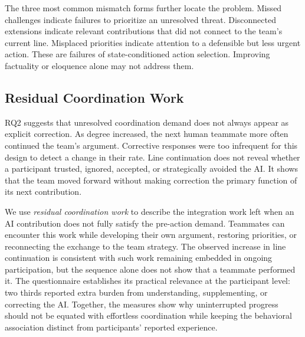 \documentclass[manuscript,review,anonymous]{acmart}
\begin{document}
The three most common mismatch forms further locate the problem. Missed challenges indicate failures to prioritize an unresolved threat. Disconnected extensions indicate relevant contributions that did not connect to the team's current line. Misplaced priorities indicate attention to a defensible but less urgent action. These are failures of state-conditioned action selection. Improving factuality or eloquence alone may not address them.

\subsection{Residual Coordination Work}

RQ2 suggests that unresolved coordination demand does not always appear as explicit correction. As degree increased, the next human teammate more often continued the team's argument. Corrective responses were too infrequent for this design to detect a change in their rate. Line continuation does not reveal whether a participant trusted, ignored, accepted, or strategically avoided the AI. It shows that the team moved forward without making correction the primary function of its next contribution.

We use \emph{residual coordination work} to describe the integration work left when an AI contribution does not fully satisfy the pre-action demand. Teammates can encounter this work while developing their own argument, restoring priorities, or reconnecting the exchange to the team strategy. The observed increase in line continuation is consistent with such work remaining embedded in ongoing participation, but the sequence alone does not show that a teammate performed it. The questionnaire establishes its practical relevance at the participant level: two thirds reported extra burden from understanding, supplementing, or correcting the AI. Together, the measures show why uninterrupted progress should not be equated with effortless coordination while keeping the behavioral association distinct from participants' reported experience.
\end{document}
